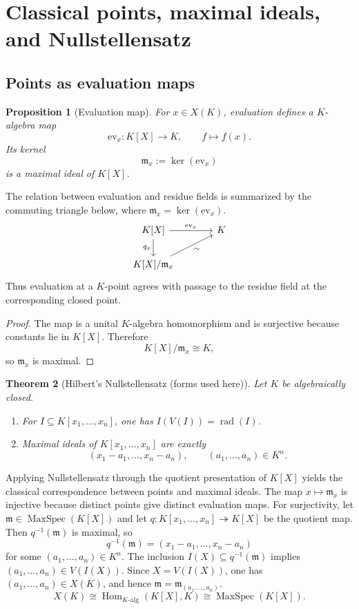 \documentclass[12pt, a4paper]{article}
\newtheorem{theorem}{Theorem}[section]
\newtheorem{proposition}[theorem]{Proposition}
\theoremstyle{definition}
\DeclareMathOperator{\MaxSpec}{MaxSpec}
\DeclareMathOperator{\Hom}{Hom}
\DeclareMathOperator{\rad}{rad}
\begin{document}
\section{Classical points, maximal ideals, and Nullstellensatz}

\subsection{Points as evaluation maps}

\begin{proposition}[Evaluation map]
For $x\in X(K)$, evaluation defines a $K$-algebra map
\[
\mathrm{ev}_x:K[X]\to K,
\qquad
f\mapsto f(x).
\]
Its kernel
\[
\mathfrak m_x:=\ker(\mathrm{ev}_x)
\]
is a maximal ideal of $K[X]$.
\end{proposition}

The relation between evaluation and residue fields is summarized by the commuting triangle below, where $\mathfrak m_x=\ker(\mathrm{ev}_x)$.
\[
\begin{tikzcd}[column sep=large]
K[X] \arrow[r, "\mathrm{ev}_x"] \arrow[d, "q_x"'] & K \\
K[X]/\mathfrak m_x \arrow[ur, "\sim"'] &
\end{tikzcd}
\]
Thus evaluation at a $K$-point agrees with passage to the residue field at the corresponding closed point.

\begin{proof}
The map is a unital $K$-algebra homomorphism and is surjective because constants lie in $K[X]$. Therefore
\[
K[X]/\mathfrak m_x\cong K,
\]
so $\mathfrak m_x$ is maximal.
\end{proof}

\begin{theorem}[Hilbert's Nullstellensatz (forms used here)]
Let $K$ be algebraically closed.
\begin{enumerate}[label=(\roman*), leftmargin=2em]
    \item For $I\subseteq K[x_1,\dots,x_n]$, one has $I(V(I))=\rad(I)$.
    \item Maximal ideals of $K[x_1,\dots,x_n]$ are exactly
    \[
    (x_1-a_1,\dots,x_n-a_n),\qquad (a_1,\dots,a_n)\in K^n.
    \]
\end{enumerate}
\end{theorem}

Applying Nullstellensatz through the quotient presentation of $K[X]$ yields the classical correspondence between points and maximal ideals. The map $x\mapsto \mathfrak m_x$ is injective because distinct points give distinct evaluation maps. For surjectivity, let $\mathfrak m\in\MaxSpec(K[X])$ and let $q:K[x_1,\dots,x_n]\twoheadrightarrow K[X]$ be the quotient map. Then $q^{-1}(\mathfrak m)$ is maximal, so
\[
q^{-1}(\mathfrak m)=(x_1-a_1,\dots,x_n-a_n)
\]
for some $(a_1,\dots,a_n)\in K^n$. The inclusion $I(X)\subseteq q^{-1}(\mathfrak m)$ implies $(a_1,\dots,a_n)\in V(I(X))$. Since $X=V(I(X))$, one has $(a_1,\dots,a_n)\in X(K)$, and hence $\mathfrak m=\mathfrak m_{(a_1,\dots,a_n)}$.
\[
\boxed{X(K)\cong \Hom_{K\text{-alg}}(K[X],K)\cong \MaxSpec(K[X]).}
\]
\end{document}

